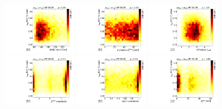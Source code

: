 \begin{figure}[tp]
  \includegraphics[width=0.32\textwidth]{figures/tauidcorrelations/tauid_vs_mMMC}
  \includegraphics[width=0.32\textwidth]{figures/tauidcorrelations/tauid_vs_mT}
  \includegraphics[width=0.32\textwidth]{figures/tauidcorrelations/tauid_vs_dR}
  \includegraphics[width=0.32\textwidth]{figures/tauidcorrelations/tauid_vs_metphi}
  \includegraphics[width=0.32\textwidth]{figures/tauidcorrelations/tauid_vs_lepeta}
  \includegraphics[width=0.32\textwidth]{figures/tauidcorrelations/tauid_vs_pttot}

\end{figure}

